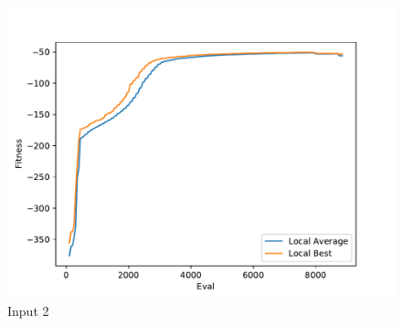 \documentclass{standalone}
\begin{document}
\begin{figure}[!htb]
	\caption{Input 2}
	\label{fig:graph_2048}
	\includegraphics[width=\textwidth]{../graphs/graphs/2048.pdf}
\end{figure}
\end{document}
